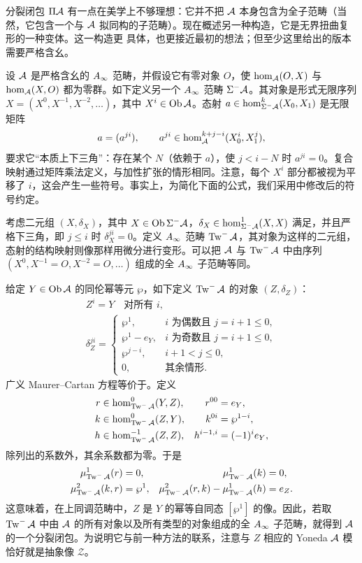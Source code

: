 \begin{note}\label{st:4.10}
分裂闭包 $\Pi\mathcal A$ 有一点在美学上不够理想：它并不把 $\mathcal A$ 本身包含为全子范畴（当然，它包含一个与 $\mathcal A$ 拟同构的子范畴）。现在概述另一种构造，它是无界扭曲复形的一种变体。这一构造更
具体，也更接近最初的想法；但至少这里给出的版本需要严格含幺。

设 $\mathcal A$ 是严格含幺的 $A_\infty$ 范畴，并假设它有零对象 $O$，使 $\hom_{\mathcal A}(O,X)$ 与 $\hom_{\mathcal A}(X,O)$ 都为零群。如下定义另一个 $A_\infty$ 范畴 $\Sigma^-\mathcal A$。其对象是形式无限序列 $X=(X^0,X^{-1},X^{-2},\ldots)$，其中 $X^i\in\operatorname{Ob}\mathcal A$。态射 $a\in\hom^k_{\Sigma^-\mathcal A}(X_0,X_1)$ 是无限矩阵
\[
a=(a^{ji}),\qquad a^{ji}\in\hom^{k+j-i}_{\mathcal A}(X_0^i,X_1^j),
\]
要求它“本质上下三角”：存在某个 $N$（依赖于 $a$），使 $j<i-N$ 时 $a^{ji}=0$。复合映射通过矩阵乘法定义，与加性扩张的情形相同。注意，每个 $X^i$ 部分都被视为平移了 $i$，这会产生一些符号。事实上，为简化下面的公式，我们采用中修改后的符号约定。

考虑二元组 $(X,\delta_X)$，其中 $X\in\operatorname{Ob}\Sigma^-\mathcal A$，$\delta_X\in\hom^1_{\Sigma^-\mathcal A}(X,X)$ 满足，并且严格下三角，即 $j\leq i$ 时 $\delta_X^{ji}=0$。定义 $A_\infty$ 范畴 $\operatorname{Tw}^-\mathcal A$，其对象为这样的二元组，态射的结构映射则像那样用微分进行变形。可以把 $\mathcal A$ 与 $\operatorname{Tw}^-\mathcal A$ 中由序列 $(X^0,X^{-1}=O,X^{-2}=O,\ldots)$ 组成的全 $A_\infty$ 子范畴等同。

给定 $Y\in\operatorname{Ob}\mathcal A$ 的同伦幂等元 $\wp$，如下定义 $\operatorname{Tw}^-\mathcal A$ 的对象 $(Z,\delta_Z)$：
\begin{equation}\label{eq:4.4}
\begin{gathered}
Z^i=Y\quad\text{对所有 }i,\\
\delta_Z^{ji}=\begin{cases}
\wp^1,&i\text{ 为偶数且 }j=i+1\leq0,\\
\wp^1-e_Y,&i\text{ 为奇数且 }j=i+1\leq0,\\
\wp^{j-i},&i+1<j\leq0,\\
0,&\text{其余情形}.
\end{cases}
\end{gathered}
\end{equation}
广义 Maurer–Cartan 方程等价于。定义
\[
\begin{aligned}
r&\in\hom^0_{\operatorname{Tw}^-\mathcal A}(Y,Z),&r^{00}&=e_Y,\\
k&\in\hom^0_{\operatorname{Tw}^-\mathcal A}(Z,Y),&k^{0i}&=\wp^{1-i},\\
h&\in\hom^{-1}_{\operatorname{Tw}^-\mathcal A}(Z,Z),&h^{i-1,i}&=(-1)^i e_Y,
\end{aligned}
\]
除列出的系数外，其余系数都为零。于是
\[
\begin{aligned}
\mu^1_{\operatorname{Tw}^-\mathcal A}(r)&=0,&\mu^1_{\operatorname{Tw}^-\mathcal A}(k)&=0,\\
\mu^2_{\operatorname{Tw}^-\mathcal A}(k,r)&=\wp^1,&\mu^2_{\operatorname{Tw}^-\mathcal A}(r,k)-\mu^1_{\operatorname{Tw}^-\mathcal A}(h)&=e_Z.
\end{aligned}
\]
这意味着，在上同调范畴中，$Z$ 是 $Y$ 的幂等自同态 $[\wp^1]$ 的像。因此，若取 $\operatorname{Tw}^-\mathcal A$ 中由 $\mathcal A$ 的所有对象以及所有类型的对象组成的全 $A_\infty$ 子范畴，就得到 $\mathcal A$ 的一个分裂闭包。为说明它与前一种方法的联系，注意与 $Z$ 相应的 Yoneda $\mathcal A$ 模恰好就是抽象像 $\mathcal Z$。
\end{note}
